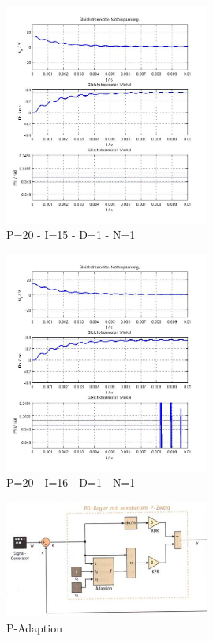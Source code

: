 \begin{figure}[ht]
	\centering
	\includegraphics[width=0.6\textwidth]{PID-P20I15D1N1.jpg}
	\caption{P=20 - I=15 - D=1 - N=1}
	\label{p20i15d1n1}
\end{figure}


\begin{figure}[ht]
	\centering
	\includegraphics[width=0.6\textwidth]{PID-P20I16D1N1.jpg}
	\caption{P=20 - I=16 - D=1 - N=1}
	\label{p2oi16d1n1}
\end{figure}


\begin{figure}[ht]
	\centering
	\includegraphics[width=0.6\textwidth]{P-Adaption.jpg}
	\caption{P-Adaption}
	\label{padaption}
\end{figure}


